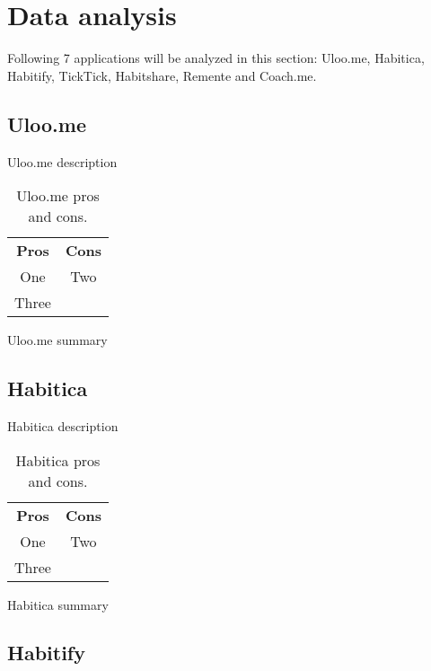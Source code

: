 \section{Data analysis}\label{sec:data-analysis}

Following 7 applications will be analyzed in this section: Uloo.me, Habitica, Habitify, TickTick, Habitshare, Remente and Coach.me.

\subsection{Uloo.me}\label{subsec:uloome}

Uloo.me description

\begin{table}[h!]
    \centering
    \begin{ctucolortab}
        \begin{tabular}{cc}
            \bfseries Pros & \bfseries Cons\\\Midrule
            One & Two\\
            Three & \\
        \end{tabular}
    \end{ctucolortab}
    \caption{Uloo.me pros and cons.}\label{tab:uloome-pros-cons}
\end{table}

Uloo.me summary


\subsection{Habitica}\label{subsec:habitica}

Habitica description

\begin{table}[h!]
    \centering
    \begin{ctucolortab}
        \begin{tabular}{cc}
            \bfseries Pros & \bfseries Cons\\\Midrule
            One & Two\\
            Three & \\
        \end{tabular}
    \end{ctucolortab}
    \caption{Habitica pros and cons.}\label{tab:habitica-pros-cons}
\end{table}

Habitica summary


\subsection{Habitify}\label{subsec:habitify}

